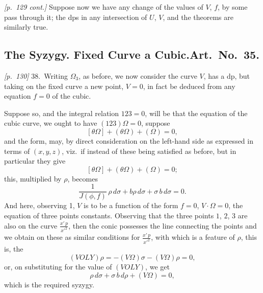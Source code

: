 \documentclass[11pt,a4paper]{book}
\begin{document}
\textit{[p.~129 cont.]} Suppose now we have any change of the values of $V$, $f$, by some pass through it; the dps in any intersection of $U$, $V$, and the theorems are similarly true.

\subsection*{The Syzygy. Fixed Curve a Cubic.\quad Art.\ No.\ 35.}

\noindent\textit{[p.~130]} 38.\ Writing $\Omega_3$, as before, we now consider the curve $V$, has a dp, but taking on the fixed curve a new point, $V = 0$, in fact be deduced from any equation $f = 0$ of the cubic.

Suppose so, and the integral relation $123 = 0$, will be that the equation of the cubic curve, we ought to have $(123)\Omega = 0$, suppose
\[
[\theta\Omega] + (\theta\Omega) + (\Omega) = 0,
\]
and the form, may, by direct consideration on the left-hand side as expressed in terms of $(x, y, z)$, viz.\ if instead of these being satisfied as before, but in particular they give
\[
[\theta\Omega] + (\theta\Omega) + (\Omega) = 0;
\]
this, multiplied by $\rho$, becomes
\[
\frac{1}{J(\phi, f)}\,\rho\,d\sigma + b\rho\,d\sigma + \sigma\,b\,d\sigma = 0.
\]
And here, observing 1, $V$ is to be a function of the form $f = 0$, $V \cdot \Omega = 0$, the equation of three points constants. Observing that the three points $1$, $2$, $3$ are also on the curve $\frac{x'\,p}{x'^2}$, then the conic possesses the line connecting the points and we obtain on these as similar conditions for $\frac{x'\,p}{x'^2}$, with which is a feature of $\rho$, this is, the
\[
(VOLY)\rho = -(V\Omega)\sigma - (V\Omega)\rho = 0,
\]
or, on substituting for the value of $(VOLY)$, we get
\[
\rho\,d\sigma + \sigma\,b\,d\rho + (V\Omega) = 0,
\]
which is the required syzygy.
\end{document}
